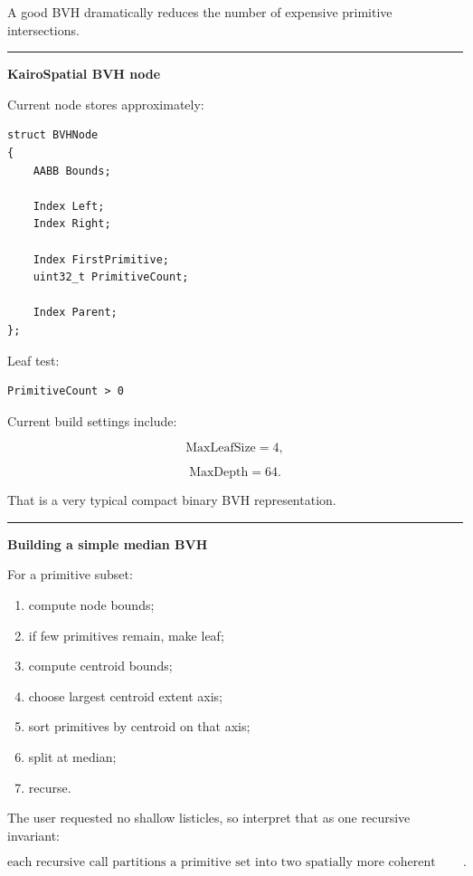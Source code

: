 A good BVH dramatically reduces the number of expensive primitive intersections.

\begin{center}\rule{0.5\linewidth}{0.5pt}\end{center}

\textbf{KairoSpatial BVH node}

Current node stores approximately:

\begin{verbatim}
struct BVHNode
{
    AABB Bounds;

    Index Left;
    Index Right;

    Index FirstPrimitive;
    uint32_t PrimitiveCount;

    Index Parent;
};
\end{verbatim}

Leaf test:

\begin{verbatim}
PrimitiveCount > 0
\end{verbatim}

Current build settings include:

\[
\text{MaxLeafSize}=4,
\]

\[
\text{MaxDepth}=64.
\]

That is a very typical compact binary BVH representation.

\begin{center}\rule{0.5\linewidth}{0.5pt}\end{center}

\textbf{Building a simple median BVH}

For a primitive subset:

\begin{enumerate}
\def\labelenumi{\arabic{enumi}.}
\tightlist
\item
  compute node bounds;
\item
  if few primitives remain, make leaf;
\item
  compute centroid bounds;
\item
  choose largest centroid extent axis;
\item
  sort primitives by centroid on that axis;
\item
  split at median;
\item
  recurse.
\end{enumerate}

The user requested no shallow listicles, so interpret that as one recursive invariant:

\[
\boxed{
\text{each recursive call partitions a primitive set into two spatially more coherent subsets until leaf criteria are reached}.
}
\]

